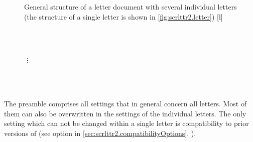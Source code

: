 \begin{figure}
  \setcapindent{0pt}%
  \begin{captionbeside}{%
      General structure of a letter document with several individual letters
      (the structure of a single letter is shown in
      \autoref{fig:scrlttr2.letter})%
      \label{fig:scrlttr2.document}%
    }[l]
    \begin{minipage}[b]{.667\linewidth}
      \centering\small\setlength{\fboxsep}{1.5ex}%
      \addtolength{\linewidth}{-\dimexpr2\fboxrule+2\fboxsep\relax}%
      \\
      \\[2pt]
      \parbox{\linewidth}{\raggedright\vspace{-.5ex}\vdots\vspace{1ex}}\\
      \\[\dimexpr\fboxsep+\fboxrule\relax]
    \end{minipage}
  \end{captionbeside}
\end{figure}

The preamble comprises all settings that in general concern all letters. Most
of them can also be overwritten in the settings of the individual letters. The
only setting which can not be changed within a single letter is compatibility
to prior versions of  (see option  in
\autoref{sec:scrlttr2.compatibilityOptions},
).

